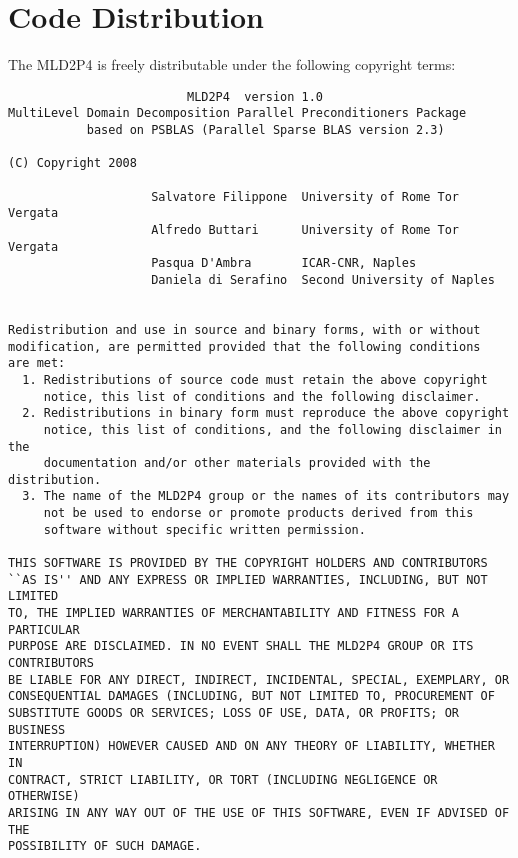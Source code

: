 \section{Code Distribution\label{sec:distribution}}

The MLD2P4 is freely distributable under the following copyright
terms:
\begin{verbatim} 
                         MLD2P4  version 1.0
MultiLevel Domain Decomposition Parallel Preconditioners Package
           based on PSBLAS (Parallel Sparse BLAS version 2.3)

(C) Copyright 2008

                    Salvatore Filippone  University of Rome Tor Vergata       
                    Alfredo Buttari      University of Rome Tor Vergata
                    Pasqua D'Ambra       ICAR-CNR, Naples
                    Daniela di Serafino  Second University of Naples


Redistribution and use in source and binary forms, with or without
modification, are permitted provided that the following conditions
are met:
  1. Redistributions of source code must retain the above copyright
     notice, this list of conditions and the following disclaimer.
  2. Redistributions in binary form must reproduce the above copyright
     notice, this list of conditions, and the following disclaimer in the
     documentation and/or other materials provided with the distribution.
  3. The name of the MLD2P4 group or the names of its contributors may
     not be used to endorse or promote products derived from this
     software without specific written permission.

THIS SOFTWARE IS PROVIDED BY THE COPYRIGHT HOLDERS AND CONTRIBUTORS
``AS IS'' AND ANY EXPRESS OR IMPLIED WARRANTIES, INCLUDING, BUT NOT LIMITED
TO, THE IMPLIED WARRANTIES OF MERCHANTABILITY AND FITNESS FOR A PARTICULAR
PURPOSE ARE DISCLAIMED. IN NO EVENT SHALL THE MLD2P4 GROUP OR ITS CONTRIBUTORS
BE LIABLE FOR ANY DIRECT, INDIRECT, INCIDENTAL, SPECIAL, EXEMPLARY, OR
CONSEQUENTIAL DAMAGES (INCLUDING, BUT NOT LIMITED TO, PROCUREMENT OF
SUBSTITUTE GOODS OR SERVICES; LOSS OF USE, DATA, OR PROFITS; OR BUSINESS
INTERRUPTION) HOWEVER CAUSED AND ON ANY THEORY OF LIABILITY, WHETHER IN
CONTRACT, STRICT LIABILITY, OR TORT (INCLUDING NEGLIGENCE OR OTHERWISE)
ARISING IN ANY WAY OUT OF THE USE OF THIS SOFTWARE, EVEN IF ADVISED OF THE
POSSIBILITY OF SUCH DAMAGE.
\end{verbatim}
